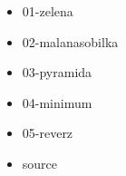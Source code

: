 



\begin{itemize}
\item 01-zelena
\item 02-malanasobilka
\item 03-pyramida
\item 04-minimum
\item 05-reverz
\item source
\end{itemize}

